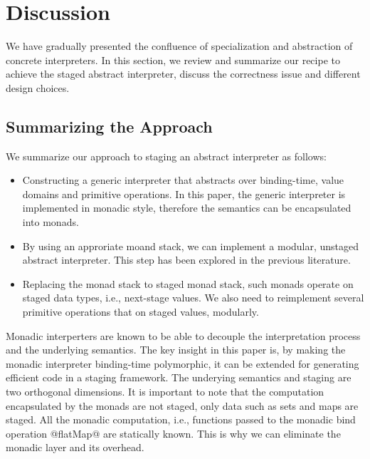 
\section{Discussion}

We have gradually presented the confluence of specialization and abstraction of
concrete interpreters. In this section, we review and summarize our recipe
to achieve the staged abstract interpreter, discuss the correctness issue
and different design choices.

\subsection{Summarizing the Approach}

We summarize our approach to staging an abstract interpreter as follows:

\begin{itemize}
  \item Constructing a generic interpreter that abstracts over binding-time,
    value domains and primitive operations. In this paper, the generic interpreter
    is implemented in monadic style, therefore the semantics can be encapsulated
    into monads.
  \item By using an approriate moand stack, we can implement a modular, unstaged
    abstract interpreter. This step has been explored in the previous literature.
  \item Replacing the monad stack to staged monad stack, such monads operate on
    staged data types, i.e., next-stage values. We also need to reimplement several
    primitive operations that on staged values, modularly.
\end{itemize}

Monadic interperters are known to be able to decouple the interpretation process
and the underlying semantics. The key insight in this paper is, by making the
monadic interpreter binding-time polymorphic, it can be extended for generating
efficient code in a staging framework. The underying semantics and staging are
two orthogonal dimensions. It is important to note that the computation
encapsulated by the monads are not staged, only data such as sets and maps are
staged. All the monadic computation, i.e., functions passed to the monadic bind
operation @flatMap@ are statically known. This is why we can eliminate the
monadic layer and its overhead.

